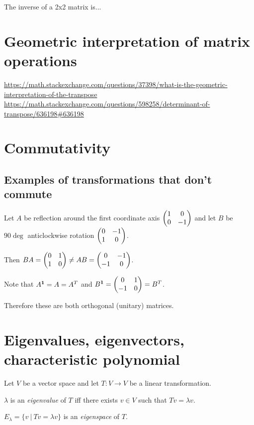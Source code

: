 \begin{theorem}
  The inverse of a 2x2 matrix is...
\end{theorem}

\section{Geometric interpretation of matrix operations}
\url{https://math.stackexchange.com/questions/37398/what-is-the-geometric-interpretation-of-the-transpose}
\url{https://math.stackexchange.com/questions/598258/determinant-of-transpose/636198#636198}


\section{Commutativity}
\subsection{Examples of transformations that don't commute}
Let $A$ be reflection around the first coordinate axis $\begin{pmatrix}1 & 0\\0 & -1\\ \end{pmatrix}$
and let $B$ be $90\deg$ anticlockwise rotation $\begin{pmatrix}0 & -1\\1 & 0\\ \end{pmatrix}$.

Then $BA = \begin{pmatrix}0 & 1\\1 & 0\\ \end{pmatrix}
\neq  AB = \begin{pmatrix}0 & -1\\-1 & 0\\ \end{pmatrix}$.

Note that $A^{\mathbf 1} = A = A^T$ and $B^{\mathbf 1} = \begin{pmatrix}0 & 1\\-1 & 0\\ \end{pmatrix} = B^T$.

Therefore these are both orthogonal (unitary) matrices.

\section{Eigenvalues, eigenvectors, characteristic polynomial}

Let $V$ be a vector space and let $T:V \to V$ be a linear transformation.

\begin{definition*}[eigenvalue]
  $\lambda$ is an \textit{eigenvalue} of $T$ iff there exists $v \in V$ such
  that $Tv = \lambda v$.
\end{definition*}

\begin{definition*}[eigenspace]
  $E_\lambda = \{v ~|~ Tv = \lambda v\}$ is an \textit{eigenspace} of $T$.
\end{definition*}

